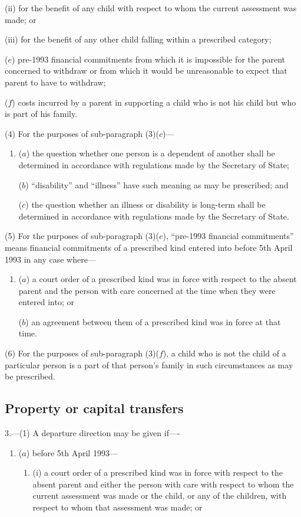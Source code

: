 \documentclass[12pt,a4paper]{article}
\begin{document}
{\begin{enumerate}
\begin{enumerate}
(ii)
for the benefit of any child with respect to whom the current assessment
was made; or

(iii) for the benefit of any other child falling within a prescribed category;
\end{enumerate}

($e$) pre-1993 financial commitments from which it is impossible for the parent
concerned to withdraw or from which it would be unreasonable to expect
that parent to have to withdraw;

($f$) costs incurred by a parent in supporting a child who is not his child but who
is part of his family.
\end{enumerate}

(4) For the purposes of sub-paragraph (3)($c$)---
\begin{enumerate}\item[]
($a$) the question whether one person is a dependent of another shall be determined
in accordance with regulations made by the Secretary of State;

($b$) “disability” and “illness” have such meaning as may be prescribed; and

($c$) the question whether an illness or disability is long-term shall be determined
in accordance with regulations made by the Secretary of State.
\end{enumerate}

(5)
For the purposes of sub-paragraph (3)($e$), “pre-1993 financial commitments” means financial commitments of a prescribed kind entered into before 5th April 1993 in any case where---
\begin{enumerate}\item[]
($a$) a court order of a prescribed kind was in force with respect to the absent
parent and the person with care concerned at the time when they were entered
into; or

($b$) an agreement between them of a prescribed kind was in force at that time.
\end{enumerate}

(6)
For the purposes of sub-paragraph (3)($f$), a child who is not the child of a particular person is a part of that person’s family in such circumstances as may be prescribed.

\subsection*{Property or capital transfers}

3.—(1) A departure direction may be given if----
\begin{enumerate}\item[]
($a$) before 5th April 1993---
\begin{enumerate}\item[]
(i) a court order of a prescribed kind was in force with respect to the absent
parent and either the person with care with respect to whom the current
assessment was made or the child, or any of the children, with respect to
whom that assessment was made; or


\end{enumerate}
\end{enumerate}}
\end{document}
